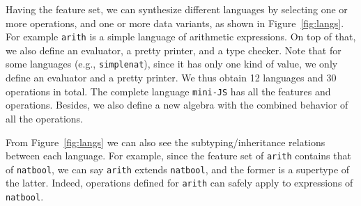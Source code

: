 Having the feature set, we can synthesize different languages by selecting one or
more operations, and one or more data variants, as shown in
Figure~\ref{fig:langs}. For example \lstinline{arith} is a simple language of
arithmetic expressions. On top of that, we also define an evaluator, a pretty
printer, and a type checker. Note that for some languages (e.g.,
\lstinline{simplenat}), since it has only one kind of value, we only define an
evaluator and a pretty printer. We thus obtain 12 languages and 30 operations in
total. The complete language \lstinline{mini-JS} has all the features and
operations. Besides, we also define a new algebra with the combined behavior of
all the operations.


From Figure~\ref{fig:langs} we can also see the subtyping/inheritance relations
between each language. For example, since the feature set of \lstinline{arith}
contains that of \lstinline{natbool}, we can say \lstinline{arith} extends
\lstinline{natbool}, and the former is a supertype of the latter. Indeed,
operations defined for \lstinline{arith} can safely apply to expressions of \lstinline{natbool}.



